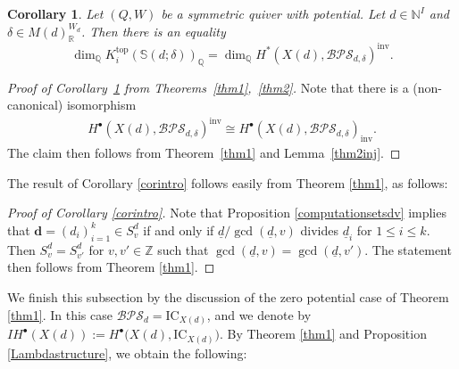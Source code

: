 \documentclass [11pt,oneside,a4paper,mathscr]{amsart}
\newtheorem{cor}[thm]{Corollary}
\theoremstyle{definition}
\renewcommand{\leq}{\leqslant}
\newcommand{\X}{\mathscr{X}}
\newcommand{\dd}{\underline{d}}
\begin{document}
\begin{cor}\label{corollarytheorem61}
Let $(Q, W)$ be a symmetric quiver with
potential. Let $d \in \mathbb{N}^I$ and $\delta \in M(d)_{\mathbb{R}}^{W_d}$. 
Then there is an equality
\begin{equation}\label{ineqq}
\dim_{\mathbb{Q}} K^{\mathrm{top}}_i(\mathbb{S}(d; \delta))_{\mathbb{Q}}= \dim_{\mathbb{Q}} H^{\ast}(X(d), \mathcal{BPS}_{d, \delta})^{\mathrm{inv}}.
\end{equation}
\end{cor}
\begin{proof}[Proof of Corollary~\ref{corollarytheorem61} from Theorems~\ref{thm1},~\ref{thm2}]
Note that there is a (non-canonical) isomorphism
\begin{align}\label{isom:noncan}
    H^\bullet(X(d), \mathcal{BPS}_{d,\delta})^{\mathrm{inv}} \cong H^\bullet(X(d), \mathcal{BPS}_{d,\delta})_{\mathrm{inv}}.
    \end{align}
The claim then follows from Theorem~\ref{thm1} and Lemma~\ref{thm2inj}.  
\end{proof}








The result of 
 Corollary \ref{corintro} follows easily from Theorem \ref{thm1}, as follows: 

 \begin{proof}[Proof of Corollary \ref{corintro}]
 Note that Proposition \ref{computationsetsdv} implies that $\mathbf{d}=(d_i)_{i=1}^k\in S^d_v$ if and only if $\dd/\gcd(\dd,v)$ divides $\dd_i$ for $1\leq i\leq k$. Then
 $S^d_v=S^d_{v'}$ for $v,v'\in\mathbb{Z}$ such that $\gcd(\dd,v)=\gcd(\dd,v')$. 
     The statement then follows from Theorem \ref{thm1}.
 \end{proof}



We finish this subsection by the discussion of the zero potential case of Theorem \ref{thm1}.
In this case $\mathcal{BPS}_d=\mathrm{IC}_{X(d)}$, 
and we denote by $I\!H^\bullet(X(d)):=H^\bullet\big(X(d), \mathrm{IC}_{X(d)}\big)$. By Theorem \ref{thm1} and Proposition \ref{Lambdastructure}, we obtain the following:
\end{document}
